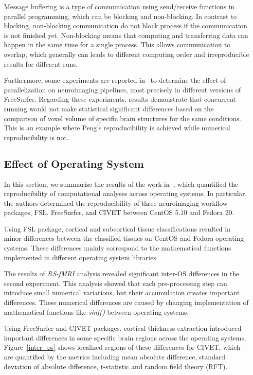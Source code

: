 Message buffering is a type of communication using send/receive 
functions in parallel programming, which can be blocking and 
non-blocking. In contrast to blocking, non-blocking communication do 
not block process if the communication is not finished yet. 
Non-blocking means that computing and transferring data can happen in 
the same time for a single process. This allows communication to 
overlap, which generally can leads to different computing order and 
irreproducible results for different runs. 

Furthermore, some experiments are reported in~\cite{Gronenschild2012} 
to determine the effect of parallelization on neuroimaging pipelines, 
most precisely in different versions of FreeSurfer. Regarding these 
experiments, results demonstrate that concurrent running would not make 
statistical significant differences based on the comparison of voxel 
volume of specific brain structures for the same conditions. This is an 
example where Peng's reproducibility is achieved while numerical 
reproducibility is not.

\subsection{Effect of Operating System}

In this section, we summarize the results of the work in~\cite{Glatard2015}, 
which quantified the reproducibility of computational analyses 
across operating systems. In particular, the authors determined 
the reproducibility of three neuroimaging workflow packages, FSL, 
FreeSurfer, and CIVET between CentOS 5.10 and Fedora 20. 

Using FSL package, cortical and subcortical tissue classifications 
resulted in minor differences between the classified tissues on CentOS 
and Fedora operating systems. These differences mainly correspond to 
the mathematical functions implemented in different operating system 
libraries. 

The results of \emph{RS-fMRI} analysis revealed significant inter-OS 
differences in the second experiment. This analysis showed that each 
pre-processing step can introduce small numerical variations, but their 
accumulation creates important differences. These numerical differences 
are caused by changing implementation of mathematical functions like 
\emph{sinf()} between operating systems.  

Using FreeSurfer and CIVET packages, cortical thickness extraction 
introduced important differences in some specific brain regions across 
the operating systems. Figure~\ref{inter_os} shows localized regions of 
these differences for CIVET, which are quantified by the metrics 
including mean absolute difference, standard deviation of absolute 
difference, t-statistic and random field theory (RFT). 

